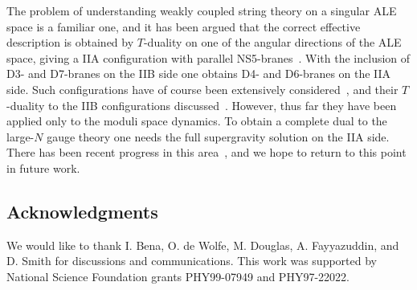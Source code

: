 \documentclass[a4paper,12pt]{article}
\renewcommand{\=}[1]{\bar{#1}}
\begin{document}
The problem of understanding weakly coupled string theory on a
singular ALE space is a familiar one, and it has been argued that the correct
effective description is obtained by $T$-duality on one of the angular directions
of the ALE space, giving a IIA configuration with parallel
NS5-branes~\cite{alesing}.  With the inclusion of D3- and D7-branes on the IIB side
one obtains D4- and D6-branes on the IIA side.  Such configurations have of course
been extensively considered~\cite{mqcd}, and their $T$-duality to the IIB
configurations discussed~\cite{tdual}.  However, thus far they have been applied
only to the moduli space dynamics.  To obtain a complete dual to the large-$N$
gauge theory one needs the full supergravity solution on the IIA side.  There has
been recent progress in this area~\cite{intm5}, and we hope to return to this
point in future work.

\subsection*{Acknowledgments}

We would like to thank I. Bena, O. de Wolfe, M. Douglas, A. Fayyazuddin, and D.
Smith for discussions and communications. This work was supported by National
Science Foundation grants PHY99-07949 and PHY97-22022.
\end{document}
